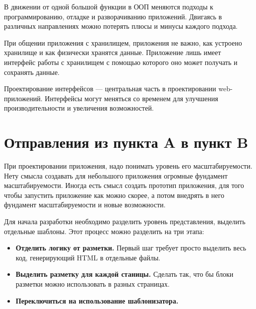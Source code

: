В движении от одной большой функции в ООП меняются подходы к программированию, отладке и разворачиванию приложений. Двигаясь в различных направлениях можно потерять плюсы и минусы каждого подхода.

При общении приложения с хранилищем, приложения не важно, как устроено хранилище и как физически хранятся данные. Приложение лишь имеет интерфейс работы с хранилищем с помощью которого оно может получать и сохранять данные.


Проектирование интерфейсов --- центральная часть в проектировании web-приложений. Интерфейсы могут меняться со временем для улучшения производительности и увеличения возможностей. 

\section{ Отправления из пункта A в пункт B } \label{sect2_4}

При проектировании приложения, надо понимать уровень его масштабируемости. Нету смысла создавать для небольшого приложения огромные фундамент масштабируемости. Иногда есть смысл создать прототип приложения, для того чтобы запустить приложение как можно скорее, а потом внедрять в него фундамент масштабируемости и новые возможности.

Для начала разработки необходимо разделить уровень представления, выделить отдельные шаблоны. Этот процесс можно разделить на три этапа:
\begin{itemize}

\item \textbf{Отделить логику от разметки.} Первый шаг требует просто выделить весь код, генерирующий HTML в отдельные файлы.

\item \textbf{Выделить разметку для каждой станицы.} Сделать так, что бы блоки разметки можно использовать в разных страницах.

\item \textbf{Переключиться на использование шаблонизатора.} 

\end{itemize}























\clearpage


